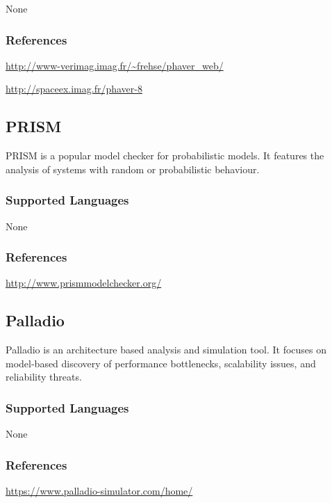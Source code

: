 None


\subsubsection{References}

\url{http://www-verimag.imag.fr/~frehse/phaver_web/}

\url{http://spaceex.imag.fr/phaver-8}



\subsection{PRISM}
\label{subsecT:PRISM}

\author{Stefan}

PRISM is a popular model checker for probabilistic models. It features the analysis of systems with random or probabilistic behaviour. 

\subsubsection{Supported Languages}

None


\subsubsection{References}

\url{http://www.prismmodelchecker.org/}


\subsection{Palladio}
\label{subsecT:Palladio}


Palladio is an architecture based analysis and simulation tool.
It focuses on model-based discovery of performance bottlenecks, scalability issues, and reliability threats.

\subsubsection{Supported Languages}

None


\subsubsection{References}

\url{https://www.palladio-simulator.com/home/}



